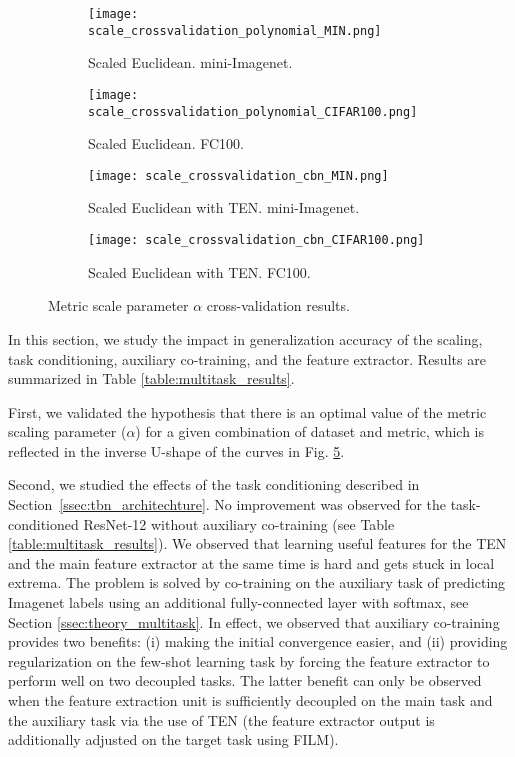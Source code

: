 \documentclass{article}
\begin{document}
\begin{figure}[t]

    \centering
    \begin{subfigure}[t]{0.49\textwidth}
        \texttt{[image: scale\_crossvalidation\_polynomial\_MIN.png]}
        \caption{Scaled Euclidean. mini-Imagenet.}
        \label{fig:scaled_euclidean_miniimagenet}
    \end{subfigure}
    \begin{subfigure}[t]{0.49\textwidth}
        \texttt{[image: scale\_crossvalidation\_polynomial\_CIFAR100.png]}
        \caption{Scaled Euclidean. FC100.}
        \label{fig:scaled_euclidean_cifar100}
    \end{subfigure}
    \begin{subfigure}[t]{0.49\textwidth}
        \texttt{[image: scale\_crossvalidation\_cbn\_MIN.png]}
        \caption{Scaled Euclidean with TEN. mini-Imagenet.}
        \label{fig:scaled_euclidean_with_tbn_miniimagenet}
    \end{subfigure}
    \begin{subfigure}[t]{0.49\textwidth}
        \texttt{[image: scale\_crossvalidation\_cbn\_CIFAR100.png]}
        \caption{Scaled Euclidean with TEN. FC100.}
        \label{fig:scaled_euclidean_with_tbn_cifar100}
    \end{subfigure}
    \caption{Metric scale parameter $\alpha$ cross-validation results.}
    \label{fig:metric_scaling}
\end{figure}




In this section, we study the impact in generalization accuracy of the scaling, task conditioning, auxiliary co-training, and the feature extractor. Results are summarized in Table \ref{table:multitask_results}.

First, we validated the hypothesis that there is an optimal value of the metric scaling parameter ($\alpha$) for a given combination of dataset and metric, which is reflected in the inverse U-shape of the curves in Fig. \ref{fig:metric_scaling}.

Second, we studied the effects of the task conditioning described in Section~\ref{ssec:tbn_architechture}. No improvement was observed for the task-conditioned ResNet-12 without auxiliary co-training (see Table \ref{table:multitask_results}). We observed that learning useful features for the TEN and the main feature extractor at the same time is hard and gets stuck in local extrema. The problem is solved by co-training on the auxiliary task of predicting Imagenet labels using an additional fully-connected layer with softmax, see Section \ref{ssec:theory_multitask}. In effect, we observed that auxiliary co-training provides two benefits: (i) making the initial convergence easier, and (ii) providing regularization on the few-shot learning task by forcing the feature extractor to perform well on two decoupled tasks. The latter benefit can only be observed when the feature extraction unit is sufficiently decoupled on the main task and the auxiliary task via the use of TEN (the feature extractor output is additionally adjusted on the target task using FILM).
\end{document}

